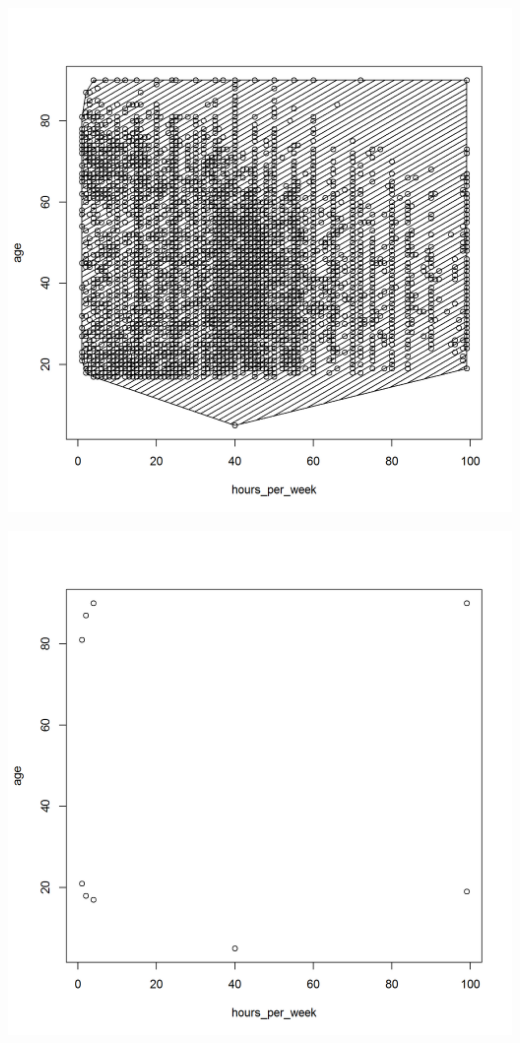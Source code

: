 \documentclass{article}\usepackage[]{graphicx}\usepackage[]{color}
\makeatletter
\def\maxwidth{ %
  \ifdim\Gin@nat@width>\linewidth
    \linewidth
  \else
    \Gin@nat@width
  \fi
}
\newenvironment{knitrout}{}{} %
\makeatother
\begin{document}
\begin{knitrout}
\color{fgcolor}
\includegraphics[width=\maxwidth]{figure/hullpolygon-1} 

\end{knitrout}

\begin{knitrout}
\color{fgcolor}
\includegraphics[width=\maxwidth]{figure/onlyhull-1} 

\end{knitrout}
\end{document}
